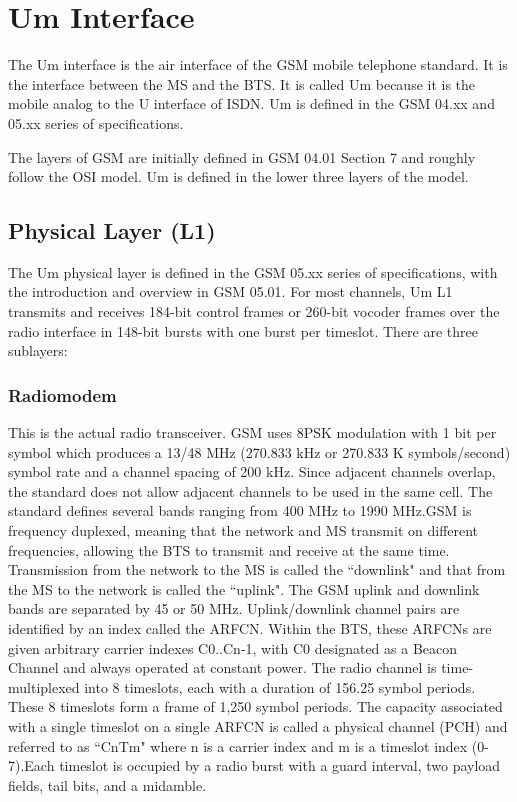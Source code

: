 \section{Um Interface}
The Um interface is the air interface of the GSM mobile telephone standard. 
It is the interface between the MS and the BTS. It is called Um because it 
is the mobile analog to the U interface of ISDN. Um is defined in the 
GSM 04.xx and 05.xx series of specifications.


The layers of GSM are initially defined in GSM 04.01 Section 7 and roughly 
follow the OSI model. Um is defined in the lower three layers of the model.

\subsection{Physical Layer (L1)}
The Um physical layer is defined in the GSM 05.xx series of specifications,
 with the introduction and overview in GSM 05.01. For most channels,
Um L1 transmits and receives 184-bit control frames or 260-bit vocoder 
frames over the radio interface in 148-bit bursts with one burst per 
timeslot. There are three sublayers:

\subsubsection*{Radiomodem}
 
This is the actual radio transceiver. GSM uses 8PSK modulation with 1 bit per
symbol which produces a 13/48 MHz (270.833 kHz or 270.833 K symbols/second)
symbol rate and a channel spacing of 200 kHz. Since adjacent channels overlap, 
the standard does not allow adjacent channels to be used in the same cell. The 
standard defines several bands ranging from 400 MHz to 1990 MHz.GSM is frequency
 duplexed, meaning that the network and MS transmit on different frequencies, 
allowing the BTS to transmit and receive at the same time. Transmission from 
the network to the MS is called the ``downlink" and that from the MS to the network 
is called the ``uplink". The GSM uplink and downlink bands are separated by 45 or 
50 MHz. Uplink/downlink channel pairs are identified by an index called the 
ARFCN. Within the BTS, these ARFCNs are given arbitrary carrier indexes 
C0..Cn-1, with C0 designated as a Beacon Channel and always operated at constant
 power. The radio channel is time-multiplexed into 8 timeslots, each with a 
duration of 156.25 symbol periods. These 8 timeslots form a frame of 1,250 
symbol periods. The capacity associated with a single timeslot on a single 
ARFCN is called a physical channel (PCH) and referred to as ``CnTm" where n is
a carrier index and m is a timeslot index (0-7).Each timeslot is occupied by 
a radio burst with a guard interval, two payload fields, tail bits, and a 
midamble.
	
